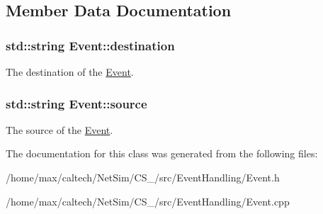 \subsection{\-Member \-Data \-Documentation}
\hypertarget{classEvent_aa28be1a89b2516ea9f570ff619f754bc}{
\subsubsection[{destination}]{\setlength{\rightskip}{0pt plus 5cm}std\-::string {\bf \-Event\-::destination}}}\label{classEvent_aa28be1a89b2516ea9f570ff619f754bc}


\-The destination of the \hyperlink{classEvent}{\-Event}. 

\hypertarget{classEvent_abc9c246c173d3433d2ffc0a4ed35bc01}{
\subsubsection[{source}]{\setlength{\rightskip}{0pt plus 5cm}std\-::string {\bf \-Event\-::source}}}\label{classEvent_abc9c246c173d3433d2ffc0a4ed35bc01}


\-The source of the \hyperlink{classEvent}{\-Event}. 



\-The documentation for this class was generated from the following files\-:\begin{DoxyCompactItemize}
\item 
/home/max/caltech/\-Net\-Sim/\-C\-S\-\_/src/\-Event\-Handling/\-Event.\-h\item 
/home/max/caltech/\-Net\-Sim/\-C\-S\-\_/src/\-Event\-Handling/\-Event.\-cpp\end{DoxyCompactItemize}
